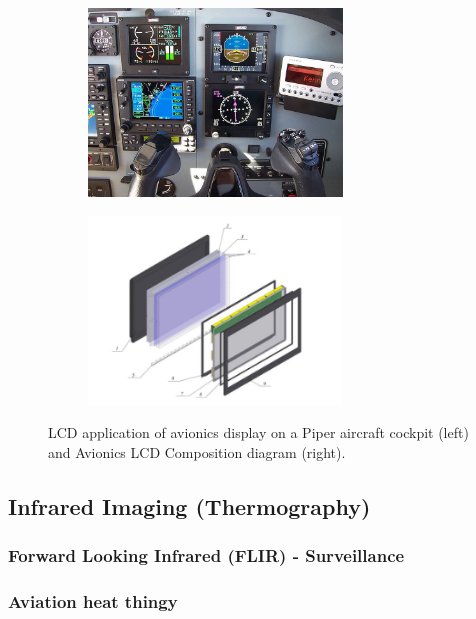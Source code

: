 \begin{figure}[!ht]
\begin{center}
%    
  \begin{subfigure}[b]{0.4\textwidth}
    \includegraphics[height=5cm]{Figures/LCD_Avionics_5inch.jpg}
  \end{subfigure}
  \begin{subfigure}[b]{0.35\textwidth}
    \includegraphics[height=5cm]{Figures/LCD_avionics_composition.PNG}
  \end{subfigure}
%  
  \caption{LCD application of avionics display on a Piper aircraft cockpit \cite{Anonymous5LCD} (left) and Avionics LCD Composition diagram \cite{Alimova2020MethodsApplications} (right).}
    \label{fig:avionics 5inc}
\end{center}
\end{figure}


\subsection{Infrared Imaging (Thermography)}
\subsubsection{Forward Looking Infrared (FLIR) - Surveillance}
\subsubsection{Aviation heat thingy}